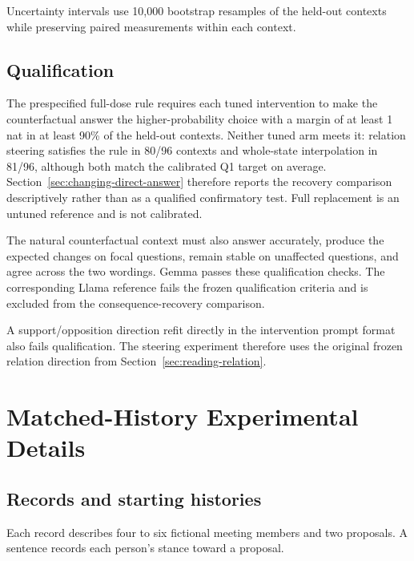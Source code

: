 \documentclass{article}
\begin{document}
Uncertainty intervals use 10,000 bootstrap resamples of the held-out
contexts while preserving paired measurements within each context.

\subsection{Qualification}

The prespecified full-dose rule requires each tuned intervention to make the
counterfactual answer the higher-probability choice with a margin of at least
1 nat in at least 90\% of the held-out contexts. Neither tuned arm meets it:
relation steering satisfies the rule in 80/96 contexts and whole-state
interpolation in 81/96, although both match the calibrated Q1 target on
average. Section~\ref{sec:changing-direct-answer} therefore reports the
recovery comparison descriptively rather than as a qualified confirmatory
test. Full replacement is an untuned reference and is not calibrated.

The natural counterfactual context must also answer accurately, produce the
expected changes on focal questions, remain stable on unaffected questions,
and agree across the two wordings. Gemma passes these qualification checks.
The corresponding Llama reference fails the frozen qualification criteria and
is excluded from the consequence-recovery comparison.

A support/opposition direction refit directly in the intervention prompt
format also fails qualification. The steering experiment therefore uses the
original frozen relation direction from Section~\ref{sec:reading-relation}.



\section{Matched-History Experimental Details}
\label{app:matched-history-details}

\subsection{Records and starting histories}

Each record describes four to six fictional meeting members and two
proposals. A sentence records each person's stance toward a proposal.
\end{document}
